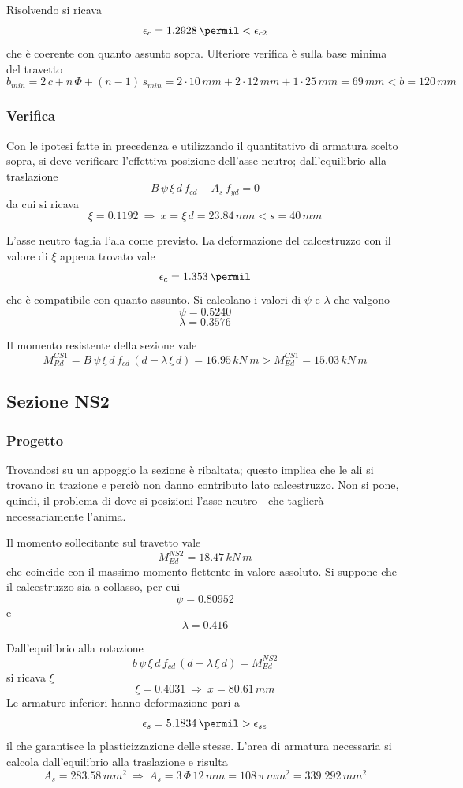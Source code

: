 Risolvendo si ricava
\[
\epsilon_c = 1.2928\,\permil < \epsilon_{c2}
\]
che è coerente con quanto assunto sopra. Ulteriore verifica è sulla base minima del travetto
\[
b_{min} = 2\,c + n\,\Phi + (n-1)\,s_{min} = 2\cdot 10\,mm + 2\cdot 12\,mm + 1\cdot 25\,mm = 69\,mm < b = 120\,mm
\]

\subsubsection{Verifica}
Con le ipotesi fatte in precedenza e utilizzando il quantitativo di armatura scelto sopra, si deve verificare l'effettiva posizione dell'asse neutro; dall'equilibrio alla traslazione
\[
B\,\psi\,\xi\,d\,f_{cd} - A_s\,f_{yd} = 0
\]
da cui si ricava
\[
    \xi = 0.1192~\Longrightarrow~x = \xi\,d = 23.84\,mm < s = 40\,mm
\]

L'asse neutro taglia l'ala come previsto. La deformazione del calcestruzzo con il valore di $\xi$ appena trovato vale
\[
    \epsilon_c = 1.353\,\permil
\]
che è compatibile con quanto assunto. Si calcolano i valori di $\psi$ e $\lambda$ che valgono
\[
    \psi = 0.5240
\]
\[
    \lambda = 0.3576
\]

Il momento resistente della sezione vale
\begin{equation}
	M_{Rd}^{CS1} = B\,\psi\,\xi\,d\,f_{cd}\,\left(d - \lambda\,\xi\,d\right) = 16.95\,kN\,m > M_{Ed}^{CS1} = 15.03\,kN\,m
\end{equation}

\subsection{Sezione NS2}
\subsubsection{Progetto}
Trovandosi su un appoggio la sezione è ribaltata; questo implica che le ali si trovano in trazione e perciò non danno contributo lato calcestruzzo. Non si pone, quindi, il problema di dove si posizioni l'asse neutro -  che taglierà necessariamente l'anima.

Il momento sollecitante sul travetto vale
\[
M_{Ed}^{NS2} = 18.47\,kN\,m
\]
che coincide con il massimo momento flettente in valore assoluto. Si suppone che il calcestruzzo sia a collasso, per cui
\[
    \psi = 0.80952
\]
e 
\[
    \lambda = 0.416
\]

Dall'equilibrio alla rotazione
\[
b\,\psi\,\xi\,d\,f_{cd}\,\left(d-\lambda\,\xi\,d\right) = M_{Ed}^{NS2}
\]
si ricava $\xi$
\[
    \xi = 0.4031~\Longrightarrow~x = 80.61\,mm
\]
Le armature inferiori hanno deformazione pari a 
\[
\epsilon_s = 5.1834\,\permil > \epsilon_{se}
\]
il che garantisce la plasticizzazione delle stesse. L'area di armatura necessaria si calcola dall'equilibrio alla traslazione e risulta
\[
    A_s = 283.58\,mm^2~\Longrightarrow~A_s = 3\,\Phi\,12\,mm = 108\,\pi\,mm^2 = 339.292\,mm^2
\]

